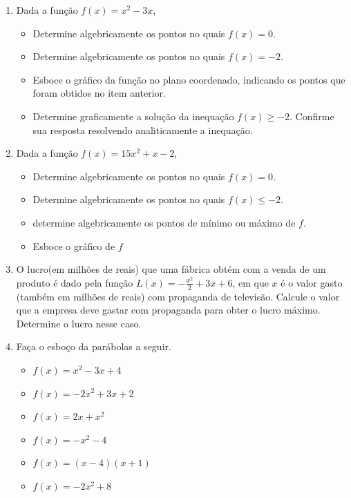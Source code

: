 \begin{enumerate}
\item Dada a função $f(x)= x^2-3x$,
\begin{itemize}
\item[a)] Determine algebricamente os pontos no quais $f(x)=0$.
\item[b)]Determine algebricamente os pontos no quais $f(x)=-2$.
\item[c)] Esboce o gráfico da função no plano coordenado, indicando os pontos que foram obtidos no item anterior.
\item[d] Determine graficamente a solução da inequação $f(x) \geq -2$. Confirme sua resposta resolvendo analiticamente a inequação.

\end{itemize}

\item Dada a função $f(x)= 15x^2+x-2$,
\begin{itemize}
\item[a)] Determine algebricamente os pontos no quais $f(x)=0$.
\item[b)]Determine algebricamente os pontos no quais $f(x) \leq-2$.
\item[c)] determine algebricamente os pontos de mínimo ou máximo de $f$.
\item[d)] Esboce o gráfico de $f$

\end{itemize}

\item O lucro(em milhões de reais) que uma fábrica obtém com a venda de um produto é dado pela função $L(x)=-\frac{x^2}{2}+3x+6$, em que $x$ é o valor gasto (também em milhões de reais) com propaganda de televisão. Calcule o valor que a empresa deve gastar com propaganda para obter o lucro máximo. Determine o lucro nesse caso.


\item Faça o esboço da parábolas a seguir.

\begin{minipage}[t]{.44\textwidth}
\begin{itemize}
\item[a)] $ f(x)=x^2-3x+4$
\item[b)] $f(x)=-2x^2+3x+2$
\item[c)] $f(x)=2x+x^2$
\end{itemize}
\end{minipage}
\begin{minipage}[t]{.44\textwidth}
\begin{itemize}
\item[d)]$f(x)= -x^2-4$
\item[e)]  $f(x)=(x-4)(x+1)$
\item[f)] $f(x)=-2x^2+8$
\end{itemize}
\end{minipage}


\end{enumerate}
